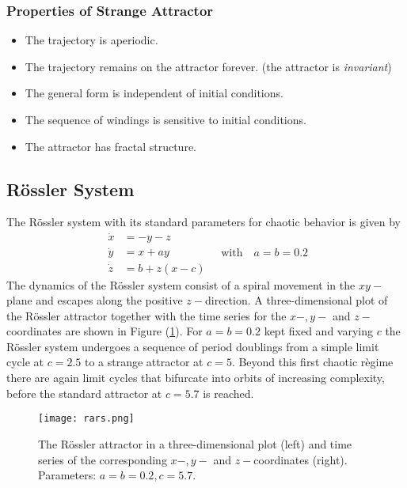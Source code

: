 \subsubsection{Properties of Strange Attractor}
\begin{itemize}
	\item The trajectory is aperiodic.
	\item The trajectory remains on the attractor forever. (the attractor is \emph{invariant})
	\item The general form is independent of initial conditions.
	\item The sequence of windings is sensitive to initial conditions.
	\item The attractor has fractal structure.
\end{itemize}
\subsection{R\"ossler System}{\label{sec:rs}}
The R\"ossler system with its standard parameters for chaotic behavior is given by
\begin{equation}
	\begin{aligned}
		\dot{x}&=-y-z\\
		\dot{y}&=x+ay\\
		\dot{z}&=b+z(x-c)
	\end{aligned}\quad\text{with}\quad
	a=b=0.2
\end{equation}
The dynamics of the R\"ossler system consist of a spiral movement in the $xy-$plane and escapes along the positive $z-$direction.
A three-dimensional plot of the R\"ossler attractor together with the time series for the $x-, y-$ and $z-$coordinates are shown in Figure (\ref{fig:rars}).
For $a=b=0.2$ kept fixed and varying $c$ the R\"ossler system undergoes a sequence of period doublings from a simple limit cycle at $c =2.5$ to a strange attractor at $c = 5$.
Beyond this first chaotic r\`egime there are again limit cycles that bifurcate into orbits of increasing complexity, before the standard attractor at $c=5.7$ is reached.
\begin{figure}[h!]
	\centering
	\texttt{[image: rars.png]}
	\caption{The R\"ossler attractor in a three-dimensional plot (left) and time series of the corresponding $x-, y-$ and $z-$coordinates (right).\\Parameters: $a=b=0.2, c =5.7$.}
	\label{fig:rars}
\end{figure}